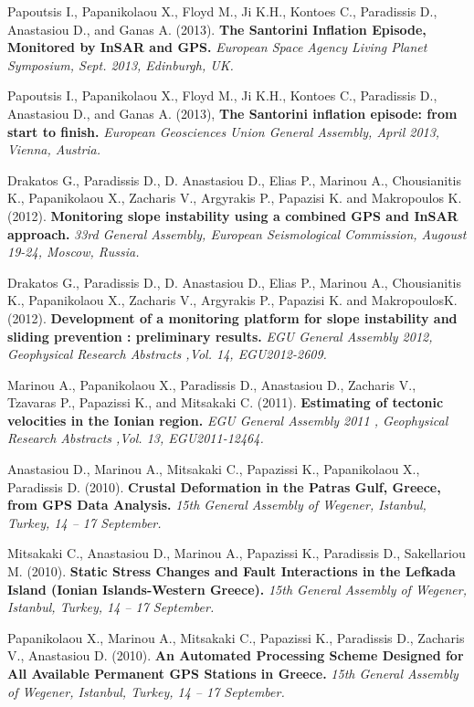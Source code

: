 \documentclass[a4paper]{Classes/cv_prof_en} %
\begin{document}
\begin{etaremune}
\item Papoutsis I., Papanikolaou X., Floyd M., Ji K.H., Kontoes C., Paradissis D., Anastasiou D., and Ganas A. (2013). \textbf{The Santorini Inflation Episode, Monitored by InSAR and GPS.} \textit{European Space Agency Living Planet Symposium, Sept. 2013, Edinburgh, UK.}
\item Papoutsis I., Papanikolaou X., Floyd M., Ji K.H., Kontoes C., Paradissis D., Anastasiou D., and Ganas A. (2013), \textbf{The Santorini inflation episode: from start to finish.} \textit{European Geosciences Union General Assembly, April 2013, Vienna, Austria.}
\item Drakatos G., Paradissis D., D. Anastasiou D., Elias P., Marinou A., Chousianitis K., Papanikolaou X., Zacharis V., Argyrakis P., Papazisi K. and Makropoulos K. (2012). \textbf{Monitoring slope instability using a combined GPS and InSAR approach.} \textit{33rd General Assembly, European Seismological Commission, Augoust 19-24, Moscow, Russia.}
\item Drakatos G., Paradissis D., D. Anastasiou D., Elias P., Marinou A., Chousianitis K., Papanikolaou X., Zacharis V., Argyrakis P., Papazisi K. and MakropoulosK. (2012). \textbf{Development of a monitoring platform for slope instability and sliding prevention : preliminary results.} \textit{EGU General Assembly 2012, Geophysical Research Abstracts ,Vol. 14, EGU2012-2609.}
\item Marinou Α., Papanikolaou X., Paradissis D., Anastasiou D., Zacharis V., Tzavaras P., Papazissi K., and Mitsakaki C. (2011). \textbf{Estimating of tectonic velocities in the Ionian region.} \textit{EGU General Assembly 2011 , Geophysical Research Abstracts ,Vol. 13, EGU2011-12464.}
\item Anastasiou D., Marinou A., Mitsakaki C., Papazissi K., Papanikolaou X., Paradissis D. (2010). \textbf{Crustal Deformation in the Patras Gulf, Greece, from GPS Data Analysis.} \textit{15th General Assembly of Wegener, Istanbul, Turkey, 14 – 17 September.}
\item Mitsakaki C., Anastasiou D., Marinou A., Papazissi K., Paradissis D., Sakellariou M. (2010). \textbf{Static Stress Changes and Fault Interactions in the Lefkada Island (Ionian Islands-Western Greece).} \textit{15th General Assembly of Wegener, Istanbul, Turkey, 14 – 17 September.}
\item Papanikolaou X., Marinou A., Mitsakaki C., Papazissi K., Paradissis D., Zacharis V., Anastasiou D. (2010). \textbf{An Automated Processing Scheme Designed for All Available Permanent GPS Stations in Greece.} \textit{15th General Assembly of Wegener, Istanbul, Turkey, 14 – 17 September.}

\end{etaremune}
\end{document}
